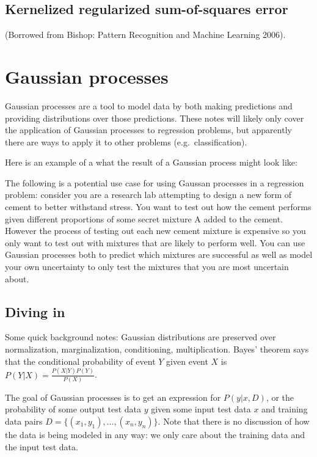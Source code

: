 \documentclass[answers,12pt]{exam}
\begin{document}
\subsection{Kernelized regularized sum-of-squares error}
(Borrowed from Bishop: Pattern Recognition and Machine Learning 2006).


\section{Gaussian processes}
Gaussian processes are a tool to model data by both making predictions and providing distributions over those predictions.
These notes will likely only cover the application of Gaussian processes to regression problems, but apparently there are ways to apply it to other problems (e.g.\ classification).

Here is an example of a what the result of a Gaussian process might look like:


The following is a potential use case for using Gaussan processes in a regression problem:
consider you are a research lab attempting to design a new form of cement to better withstand stress.
You want to test out how the cement performs given different proportions of some secret mixture A added to the cement.
However the process of testing out each new cement mixture is expensive so you only want to test out with mixtures that are likely to perform well.
You can use Gaussian processes both to predict which mixtures are successful as well as model your own uncertainty to only test the mixtures that you are most uncertain about.


\subsection{Diving in}
Some quick background notes:
Gaussian distributions are preserved over normalization, marginalization, conditioning, multiplication.
Bayes' theorem says that the conditional probability of event $Y$ given event $X$ is $P(Y|X)=\frac{P(X|Y)P(Y)}{P(X)}$.

The goal of Gaussian processes is to get an expression for $P(y|x,D)$, or the probability of some output test data $y$ given some input test data $x$ and training data pairs $D = \{(x_1, y_1), \dots , (x_n,y_n)\}$.
Note that there is no discussion of how the data is being modeled in any way: we only care about the training data and the input test data.
\end{document}
